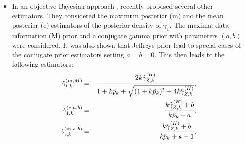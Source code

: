 \begin{itemize}
\item
In an objective Bayesian approach \citep[see][]{zellner1971introduction}, \cite{ameraoui2016bayesian} recently proposed several other estimators. They considered the maximum posterior (m) and the mean posterior (e) estimators of the posterior density of $\gamma_1$. The maximal data information (M) prior and a conjugate gamma prior with parameters $(a,b)$ were considered. It was also shown that Jeffreys prior lead to special cases of the conjugate prior estimators setting $a=b=0$. This then leads to the following estimators:
\begin{eqnarray}
\hat{\gamma}_{1,k}^{(m,M)}&=&{2 k\hat{\gamma}_{Z,k}^{(H)} \over 1+k\hat{p}_k+\sqrt{(1+k\hat{p}_k)^2+4k\hat{\gamma}_{Z,k}^{(H)}}} , \label{Bayes1} \\
\hat{\gamma}_{1,k}^{(e,a,b)} &=& {k\hat{\gamma}_{Z,k}^{(H)}+b \over k\hat{p}_k +a},
\label{Bayes2} \\
\hat{\gamma}_{1,k}^{(m,a,b)} &=& {k\hat{\gamma}_{Z,k}^{(H)}+b \over k\hat{p}_k +a-1}.
\label{Bayes3}
\end{eqnarray}
\end{itemize}

